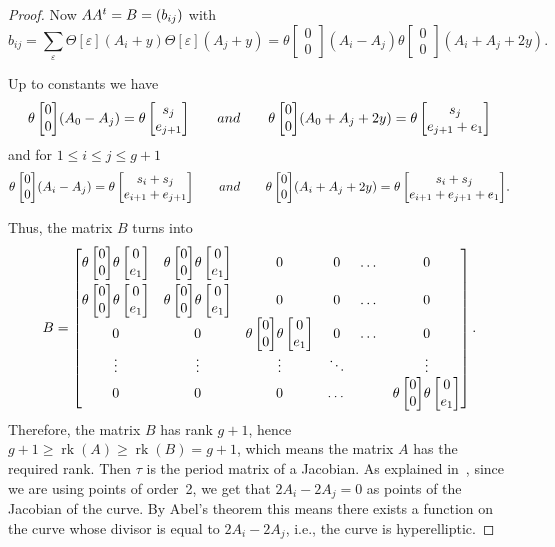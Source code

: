 \documentclass[11pt]{article}
\numberwithin{equation}{section}
\numberwithin{equation}{section}
\newcommand{\ep}{\varepsilon}
\def\t{\theta}
\def\T{\Theta}
\def\tt#1#2{{\t\left[\begin{matrix}{#1}\\ {#2}\end{matrix}\right]}}
\begin{document}
\begin{proof}
 Now $A A^{\rm t}= B=(b_{ij}) $ with
\[
b_{ij}=\sum_{\ep} \T[\ep] (A_i+y)\T[\ep] (A_j+y)=\tt {0}{0}(A_i-A_j)\tt {0}{0}(A_i+A_j+2y).
\]

Up to constants we have
\[
\tt {0}{0}(A_0-A_j)=\tt{s_j}{e_{j+1}} \qquad {\rm and}\qquad \tt {0}{0}(A_0+A_j+2y)=\tt{s_j}{e_{j+1}+e_1}
\]
and for $1\leq i\leq j\leq g+1$
\[
\tt {0}{0}(A_i-A_j)=\tt{s_i+s_j}{e_{i+1}+e_{j+1}} \qquad {\rm and}\qquad \tt {0}{0}(A_i+A_j+2y)=\tt{s_i+s_j}{e_{i+1}+e_{j+1}+e_1}.
\]

Thus, the matrix $B$ turns into
\[ B=
 \begin{bmatrix} \tt {0}{0} \tt {0}{e_1} & \tt {0}{0} \tt {0}{e_1}&0&0&\dots&0\vspace{1mm}\\
\tt {0}{0} \tt {0}{e_1} & \tt {0}{0} \tt {0}{e_1}&0&0&\dots&0\\
0& 0&\tt {0}{0} \tt {0}{e_1}&0&\dots&0\\
\vdots & \vdots &\vdots &\ddots& &\vdots\\
0& 0&0&\dots& &\tt {0}{0} \tt {0}{e_1}
 \end{bmatrix}.
\]
Therefore, the matrix $B$ has rank $g+1$, hence $g+1\geq \operatorname{rk}(A)\geq \operatorname{rk}(B)=g+1$, which means the matrix $A$ has the required rank. Then $\tau$ is the period matrix of a Jacobian. As explained in~\cite{Gr}, since we are using points of order~2, we get that $2A_i- 2A_j=0$ as points of the Jacobian of the curve. By Abel's theorem this means there exists a function on the curve whose divisor is equal to $2A_i -2A_j$, i.e., the curve is hyperelliptic.
\end{proof}
\end{document}
